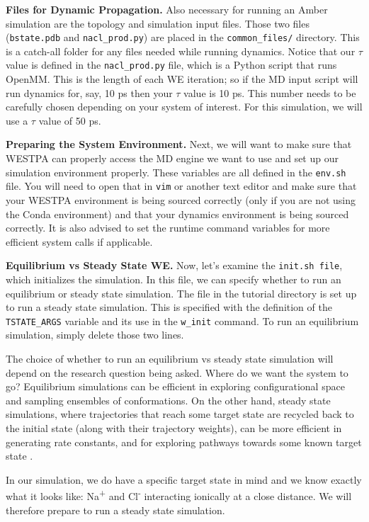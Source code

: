 \documentclass[9pt,tutorial,pubversion]{livecoms}
\begin{document}
\textbf{Files for Dynamic Propagation.} Also necessary for running an Amber simulation are the topology and simulation input files. 
Those two files (\verb|bstate.pdb| and \verb|nacl_prod.py|) are placed in the \verb|common_files/| directory. 
This is a catch-all folder for any files needed while running dynamics. 
Notice that our $\tau$ value is defined in the \verb|nacl_prod.py| file, which is a Python script that runs OpenMM.  
This is the length of each WE iteration; so if the MD input script will run dynamics for, say, 10 ps then your $\tau$ value is 10 ps. 
This number needs to be carefully chosen depending on your system of interest. 
For this simulation, we will use a $\tau$ value of 50 ps. 

\textbf{Preparing the System Environment.} Next, we will want to make sure that WESTPA can properly access the MD engine we want to use and set up our simulation environment properly. 
These variables are all defined in the \verb|env.sh| file. 
You will need to open that in \verb|vim| or another text editor and make sure that your WESTPA environment is being sourced correctly (only if you are not using the Conda environment) and that your dynamics environment is being sourced correctly. 
It is also advised to set the runtime command variables for more efficient system calls if applicable.

\textbf{Equilibrium vs Steady State WE.} Now, let’s examine the \verb|init.sh file|, which initializes the simulation. 
In this file, we can specify whether to run an equilibrium or steady state simulation. 
The file in the tutorial directory is set up to run a steady state simulation. 
This is specified with the definition of the \verb|TSTATE_ARGS| variable and its use in the \verb|w_init| command. 
To run an equilibrium simulation, simply delete those two lines.

The choice of whether to run an equilibrium vs steady state simulation will depend on the research question being asked. 
Where do we want the system to go?  
Equilibrium simulations can be efficient in exploring configurational space and sampling ensembles of conformations. 
On the other hand, steady state simulations, where trajectories that reach some target state are recycled back to the initial state (along with their trajectory weights), can be more efficient in generating rate constants, and for exploring pathways towards some known target state \citep{Pratt2019}. 

In our simulation, we do have a specific target state in mind and we know exactly what it looks like: Na\textsuperscript{+} and Cl\textsuperscript{-} interacting ionically at a close distance. 
We will therefore prepare to run a steady state simulation. 
\end{document}
